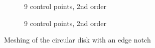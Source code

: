 \begin{figure}
        \begin{subfigure}[b]{0.5\linewidth}
            \centering
            \caption{9 control points, 2nd order}
        \end{subfigure}
        \begin{subfigure}[b]{0.5\linewidth}
            \centering
            \caption{9 control points, 2nd order}
        \end{subfigure}
        \caption{Meshing of the circular disk with an edge notch}
        \label{iso_fig:circular_disk_mesh}
    \end{figure}

